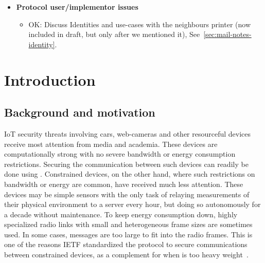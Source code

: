 \documentclass[runningheads,draft,x11names]{llncs}
\begin{document}
{\begin{itemize}
\begin{itemize}
\begin{itemize}
                confirmation and hence explicit inj-agree also for $I$.
                \item Discuss Transcipt hashes that lag behind one message and that
                it is supposed to "cover as much as possible", but sometimes
                does not (check tamarin model also for inconsistencies between
                methods). Unclear design except "as much as possible".
                \end{itemize}
            \item{\textbf{Protocol user/implementor issues}}
                \begin{itemize}
                \item OK: Discuss Identities and use-cases with the neighbours printer
                (now included in draft, but only after we mentioned it),
                See~\ref{sec:mail-notes-identity}.
                \end{itemize}
        \end{itemize}
\end{itemize}
}

\section{Introduction}
\label{sec:introduction}
\subsection{Background and motivation}
\label{sec:motivation}
IoT security threats involving cars, web-cameras and other resourceful devices
receive most attention from media and academia.
%
These devices are computationally strong with no severe bandwidth or energy
consumption restrictions.
%
Securing the communication between such devices can readily be done using
\mDandTls.
%
Constrained devices, on the other hand, where such restrictions on bandwidth or
energy are common, have received much less attention.
%
These devices may be simple sensors with the only task of relaying
measurements of their physical environment to a server every hour, but doing so
autonomously for a decade without maintenance.
%
To keep energy consumption down, highly specialized radio links with small
and heterogeneous frame sizes are sometimes used.
%
In some cases, \mDandTls{} messages are too large to fit into the radio frames.
%
This is one of the reasons IETF standardized the \mOscore{} protocol to secure
communications between constrained devices, as a complement for when
\mDandTls{} is too heavy weight~\cite{rfc8613}.
%
\end{document}
